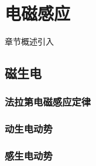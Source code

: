 \chapter{电磁感应}\label{19}

章节概述引入

\section{磁生电}\label{19-1}

\subsection{法拉第电磁感应定律}\label{19-1-1}

\subsection{动生电动势}\label{19-1-2}

\subsection{感生电动势}\label{19-1-3}
